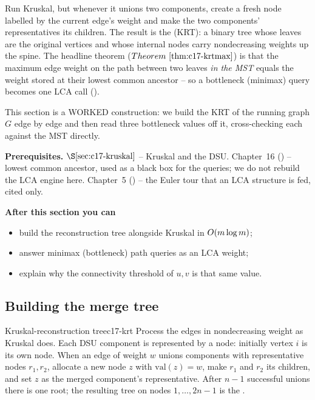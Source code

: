 \begin{topicintro}
Run Kruskal, but whenever it unions two components, create a fresh node labelled
by the current edge's weight and make the two components' representatives its
children.  The result is the  (KRT): a binary
tree whose leaves are the original vertices and whose internal nodes carry
nondecreasing weights up the spine.  The headline theorem (\(\thmref{c17-krtmax}\))
is that the maximum edge weight on the path between two leaves \emph{in the MST}
equals the weight stored at their lowest common ancestor -- so a bottleneck
(minimax) query becomes one LCA call ().

This section is a WORKED construction: we build the KRT of the running graph
\(G\) edge by edge and then read three bottleneck values off it, cross-checking
each against the MST directly.

\textbf{Prerequisites.} \(\secref{c17-kruskal}\) -- Kruskal and the DSU.
Chapter~16 () -- lowest common ancestor, used as a black box for the
queries; we do not rebuild the LCA engine here.  Chapter~5 () -- the
Euler tour that an LCA structure is fed, cited only.

\textbf{After this section you can}
\begin{itemize}[nosep]
  \item build the reconstruction tree alongside Kruskal in \(O(m\log m)\); \hfill{}
  \item answer minimax (bottleneck) path queries as an LCA weight; \hfill{}
  \item explain why the connectivity threshold of \(u,v\) is that same value. \hfill{}
\end{itemize}
\end{topicintro}

\subsection{Building the merge tree}

\begin{definition}{Kruskal-reconstruction tree}{c17-krt}
Process the edges in nondecreasing weight as Kruskal does.  Each DSU component is
represented by a node: initially vertex \(i\) is its own node.  When an edge of
weight \(w\) unions components with representative nodes \(r_1, r_2\), allocate a
new node \(z\) with \(\mathrm{val}(z)=w\), make \(r_1\) and \(r_2\) its children,
and set \(z\) as the merged component's representative.  After \(n-1\) successful
unions there is one root; the resulting tree on nodes \(1,\dots,2n-1\) is the
.
\end{definition}

